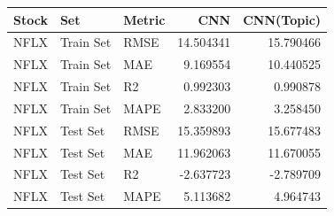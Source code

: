 \begin{tabular}{lllrr}
\toprule
Stock & Set & Metric & CNN & CNN(Topic) \\
\midrule
NFLX & Train Set & RMSE & 14.504341 & 15.790466 \\
NFLX & Train Set & MAE & 9.169554 & 10.440525 \\
NFLX & Train Set & R2 & 0.992303 & 0.990878 \\
NFLX & Train Set & MAPE & 2.833200 & 3.258450 \\
NFLX & Test Set & RMSE & 15.359893 & 15.677483 \\
NFLX & Test Set & MAE & 11.962063 & 11.670055 \\
NFLX & Test Set & R2 & -2.637723 & -2.789709 \\
NFLX & Test Set & MAPE & 5.113682 & 4.964743 \\
\bottomrule
\end{tabular}
